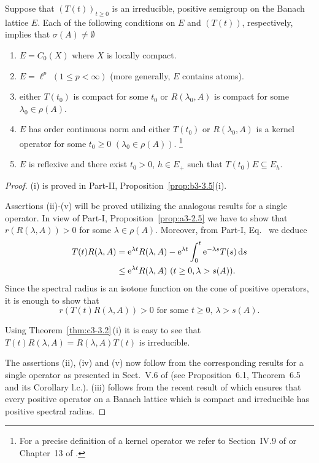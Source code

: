 \begin{theorem}\label{thm:c3-3.7}

Suppose that $(T(t))_{t\geq 0}$ is an irreducible, positive semigroup on the Banach lattice $E$.
Each of the following conditions on $E$ and $(T(t))$, respectively, implies that $\sigma(A) \neq \emptyset$
\begin{enumerate}[\upshape (i)]
	\item
	$E = C_{0}(X)$ where $X$ is locally compact.

	\item 
	$E = \ell^{p}$ $(1 \leq p < \infty)$ (more generally, $E$ contains atoms).

	\item either $T(t_{0})$ is compact for some $t_{0}$ or $R(\lambda_{0},A)$ is compact for some $\lambda_{0} \in \rho(A)$.

	\item 
	$E$ has order continuous norm and either $T(t_{0})$ or $R(\lambda_{0},A)$ is a kernel operator for some $t_{0} \geq 0$ $(\lambda_{0} \in \rho(A))$. 	
	\footnote[1]{For a precise definition of a kernel operator we refer to Section~IV.9 of \textcite{schaefer:1974} or Chapter~13 of \textcite{zaanen:1983}.}

	\item 
	$E$ is reflexive and there exist $t_{0} > 0$, $h \in E_{+}$ such that $T(t_{0})E \subseteq E_{h}$. 
\end{enumerate}
\end{theorem}
\begin{proof}
	(i) is proved in Part-II, Proposition~\ref{prop:b3-3.5}(i).
	
	Assertions (ii)-(v) will be proved utilizing the analogous results for a single operator.
	In view of Part-I, Proposition~\ref{prop:a3-2.5} we have to show that $r(R(\lambda,A)) > 0$ for some $\lambda \in \rho(A)$.
	Moreover, from Part-I, Eq.~ we deduce
	\begin{align*}
		T(t)R(\lambda,A) & = \eu^{\lambda t}R(\lambda,A) - \eu^{\lambda t}\int_{0}^{t} \eu^{-\lambda s}T(s)\ds \\
		& \leq \eu^{\lambda t}R(\lambda,A) \ (t\geq 0, \lambda>s(A)) .
	\end{align*}
	Since the spectral radius is an isotone function on the cone of positive operators, it is enough to show that
	\begin{equation}\label{eq:c3-3.12}
		r(T(t)R(\lambda,A)) > 0 \text{ for some } t \geq 0,\, \lambda > s(A).
	\end{equation}
	
	Using Theorem~\ref{thm:c3-3.2}\,(i) it is easy to see that $T(t)R(\lambda,A) = R(\lambda,A)T(t)$ is irreducible.
	
	The assertions (ii), (iv) and (v) now follow from the corresponding results for a single operator as presented in Sect.~V.6 of \textcite{schaefer:1974} (see Proposition~6.1, Theorem~6.5 and its Corollary l.c.).
	(iii) follows from the recent result of \textcite{depagter:1986} which ensures that every positive operator on a Banach lattice which is compact and irreducible has positive spectral radius.
\end{proof}
